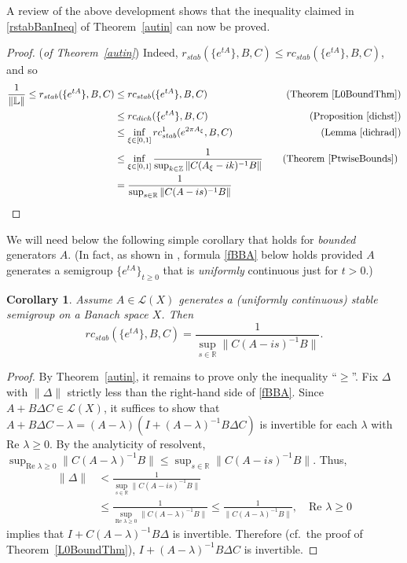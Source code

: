 \documentclass[10pt,psamsfonts,leqno]{siamltex}
\newtheorem{cor}[prop]{Corollary}
\newcommand{\bbR}{\mathbb{R}}
\newcommand{\bbZ}{\mathbb{Z}}
\newcommand{\bbL}{\mathbb{L}}
\newcommand{\rstab}{r_{stab}}
\newcommand{\rcstab}{rc_{stab}}
\begin{document}
A review of the above development shows that the
inequality claimed in \eqref{rstabBanIneq} of Theorem~\ref{autin}
can now be proved.
\begin{proof}({\em of Theorem~\ref{autin}})
Indeed,
$\rstab(\{e^{tA}\},B,C)\le \rcstab(\{e^{tA}\},B,C)$, and so
\begin{alignat*}{3}
\frac{1}{\|\bbL\|}\le r_{stab}(\{e^{tA}\},B,C)
&\le  rc_{stab} (\{e^{tA}\},B,C)
       &\quad \mbox{(Theorem~\ref{L0BoundThm})} \\
\null & \le rc_{dich} (\{e^{tA}\},B,C)
       &\quad\mbox{(Proposition~\ref{dichst})} \\
\null & \le \inf_{\xi\in[0,1]}\rcstab^1(e^{2\pi A_\xi},B,C)
       &\quad \mbox{(Lemma~\ref{dichrad})} \\
\null &\le
\inf_{\xi\in[0,1]}\frac{1}{\sup_{k\in\bbZ}\|C(A_\xi-ik)^{-1}B\|}
       &\quad\mbox{(Theorem~\ref{PtwiseBounds})}\ \\
\null &= \frac{1}{\sup_{s\in\bbR}\|C(A-is)^{-1}B\|} &\null
\end{alignat*}
\end{proof}

We will need below the following simple corollary that holds for
{\it bounded} generators $A$.  (In fact, as shown in
\cite[Cor.~2.5]{FishvN}, formula \eqref{fBBA} below holds
provided $A$ generates a semigroup $\{e^{tA}\}_{t\ge0}$ that is
{\it uniformly} continuous just for $t>0$.)

\begin{cor}\label{bnddcase}
Assume $A\in{\mathcal L}(X)$ generates a (uniformly continuous) stable
semigroup on a Banach space $X$. Then
\begin{equation}\label{fBBA}
\rcstab(\{e^{tA}\},B,C)=\frac{1}{\sup_{s\in\bbR}\|C(A-is)^{-1}B\|}.
\end{equation}
\end{cor}
\begin{proof} By Theorem~\ref{autin}, it remains to prove only
the inequality ``$\ge$''. Fix $\Delta$ with $\|\Delta\|$ strictly less
than the right-hand side of \eqref{fBBA}.
Since $A+B\Delta C\in {\mathcal L}(X)$, it suffices
to show that $A+B\Delta C-\lambda=(A-\lambda)(I+(A-\lambda)^{-1}B\Delta
C)$
is invertible for each $\lambda$ with $\text{Re }\lambda\ge 0$. By the
analyticity of resolvent,
$\sup_{\text{Re }\lambda\ge
0}\|C(A-\lambda)^{-1}B\|\le\sup_{s\in{\mathbb
R}}\|C(A-is)^{-1}B\|$.
Thus,
$$
\begin{aligned}
\|\Delta\|&< \frac{1}{\sup_{s\in\bbR}\|C(A-is)^{-1}B\|}\\
&\le \frac{1}{\sup_{\text{Re }\lambda\ge 0}\|C(A-\lambda)^{-1}B\|}
\le \frac{1}{\|C(A-\lambda)^{-1}B\|},\quad \text{Re }\lambda\ge 0
\end{aligned}
$$
implies that $I+C(A-\lambda)^{-1}B\Delta$ is invertible. Therefore
(cf.~the proof of Theorem~\ref{L0BoundThm}), $I+(A-\lambda)^{-1}B\Delta
C$ is
invertible.
\end{proof}
\end{document}
